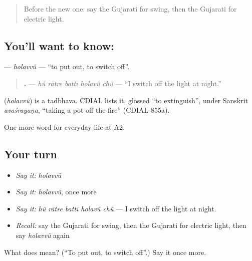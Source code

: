 \label{lesson:GU-C160-holavvu}



\begin{quote}
Before the new one: say the Gujarati for swing, then the Gujarati for electric light.
\end{quote}

\subsection*{You'll want to know: }
\textbf{} — \emph{holavvũ} — \textquotedblleft{}to put out, to switch off\textquotedblright{}.

\begin{quote}
\textbf{    .} — \emph{hũ rātre battī holavũ chũ} — \textquotedblleft{}I switch off the light at night.\textquotedblright{}
\end{quote}

\begin{cousinweb}
\textbf{} (\emph{holavvũ}) is a tadbhava. CDIAL lists it, glossed \textquotedblleft{}to extinguish\textquotedblright{}, under Sanskrit \emph{avaśrayaṇa}, \textquotedblleft{}taking a pot off the fire\textquotedblright{} (CDIAL 855a).
\end{cousinweb}

\begin{grammarlens}[title={What you've built}]
One more word for everyday life at A2.
\end{grammarlens}

\subsection*{Your turn}
\begin{itemize}
\raggedright
  \item \emph{Say it:} \emph{holavvũ}
  \item \emph{Say it:} \emph{holavvũ}, once more
  \item \emph{Say it:} \emph{hũ rātre battī holavũ chũ} — I switch off the light at night.
  \item \emph{Recall:} say the Gujarati for swing, then the Gujarati for electric light, then say \emph{holavvũ} again
\end{itemize}

\begin{tcolorbox}[breakable,colback=teal!4,colframe=teal!35!black,title={Before you move on}]
What does  mean? (\textquotedblleft{}To put out, to switch off\textquotedblright{}.) Say it once more.
\end{tcolorbox}
